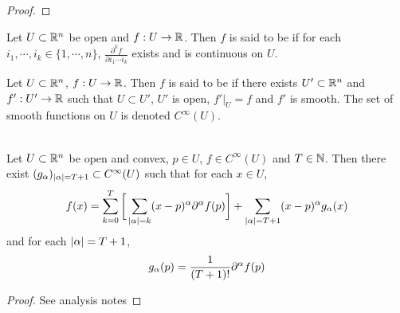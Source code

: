 \documentclass{book}
\begin{document}
	\begin{proof}
		
	\end{proof}

	\begin{defn} 
		Let $U \subset \mathbb{R}^n$ be open and $f: U \rightarrow \mathbb{R}$. Then $f$ is said to be  if for each $i_1, \cdots, i_k \in \{1, \cdots, n\}$, $\frac{\partial^k f}{\partial i_1 \cdots i_k}$ exists and is continuous on $U$.
	\end{defn}

	\begin{defn} 
		Let $U \subset \mathbb{R}^n$, $f: U \rightarrow \mathbb{R}$. Then $f$ is said to be  if there exists $U' 
		\subset \mathbb{R}^n$ and $f':U' \rightarrow \mathbb{R}$ such that $U \subset U'$, $U'$ is open, $f'|_U = f$ and $f'$ is smooth. The set of smooth functions on $U$ is denoted $C^{\infty}(U)$.
	\end{defn}


	\begin{thm} \\ 
		Let $U \subset \mathbb{R}^n$ be open and convex, $p \in U$, $f \in C^{\infty}(U)$ and $T \in \mathbb{N}$. Then there exist $(g_{\alpha})_{|\alpha| = T+1} \subset C^{\infty}(U)$ such that for each $x \in U$, 
		$$f(x) = \sum_{k=0}^{T} \bigg[\sum_{|\alpha| = k}(x - p)^{\alpha} \partial^{\alpha} f (p) \bigg] + \sum_{|\alpha| = T+1}(x - p)^{\alpha} g_{\alpha}(x)$$ and for each $|\alpha|= T+1$, $$g_{\alpha}(p) = \frac{1}{(T+1)!}\partial^{\alpha} f(p)$$
	\end{thm}
	
	\begin{proof}
	See analysis notes
	\end{proof}

\end{document}
